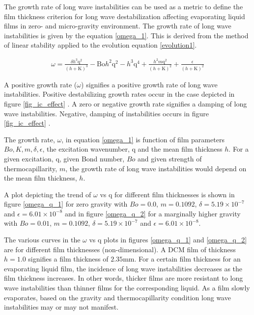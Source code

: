 \documentclass[a4paper,12pt]{article}
\begin{document}
The growth rate of long wave instabilities can be used as a metric to define the film thickness criterion for long wave destabilization affecting evaporating liquid films in zero- and micro-gravity environment. The growth rate of long wave instabilities is given by the equation \ref{omega_1}. This is derived from the method of linear stability applied to the evolution equation \ref{evolution1}.

\begin{align} \label{omega_1}
\omega = \frac{\delta  h^3 \text{q}^2}{(h+\text{K})^3}-\text{Bo} h^2 \text{q}^2-h^3 \text{q}^4 +\frac{h^2 m \text{q}^2}{(h+\text{K})^2}+\frac{\epsilon}{(h+\text{K})^2}
\end{align}

A positive growth rate ($\omega$) signifies a positive growth rate of long wave instabilities. Positive destabilizing growth rates occur in the case depicted in figure \ref{fig_ic_effect} . A zero or negative growth rate signifies a damping of long wave instabilities. Negative, damping of instabilities occurs in figure \ref{fig_ic_effect} .

The growth rate, $\omega$, in equation \ref{omega_1} is function of film parameters $Bo, K, m, \delta, \epsilon$, the excitation wavenumber, q and the mean film thickness $h$. For a given excitation, q, given Bond number, $Bo$ and given strength of thermocapillarity, $m$, the growth rate of long wave instabilities would depend on the mean film thickness, $h$.

A plot depicting the trend of $\omega$ vs q for different film thicknesses is shown in figure \ref{omega_q_1} for zero gravity with $Bo=0.0$, $m=0.1092$, $\delta=5.19 \times 10^{-7}$ and $\epsilon=6.01 \times 10^{-8}$ and in figure \ref{omega_q_2} for a marginally higher gravity with $Bo=0.01$, $m=0.1092$, $\delta=5.19 \times 10^{-7}$ and $\epsilon=6.01 \times 10^{-8}$.

The various curves in the $\omega$ vs q plots in figures \ref{omega_q_1} and \ref{omega_q_2} are for different film thicknesses (non-dimensional). A DCM film of thickness $h=1.0$ signifies a film thickness of $2.35$mm. For a certain film thickness for an evaporating liquid film, the incidence of long wave instabilities decreases as the film thickness increases. In other words, thicker films are more resistant to long wave instabilities than thinner films for the corresponding liquid. As a film slowly evaporates, based on the gravity and thermocapillarity condition long wave instabilities may or may not manifest.
\end{document}
